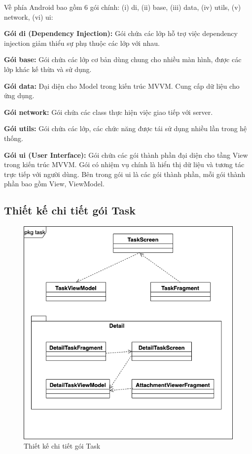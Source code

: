 \documentclass[../Main.tex]{subfiles}
\begin{document}
Về phía Android bao gồm 6 gói chính: (i) di, (ii) base, (iii) data, (iv) utils, (v) network, (vi) ui: 

\textbf{Gói di (Dependency Injection):} Gói chứa các lớp hỗ trợ việc dependency injection giảm thiểu sự phụ thuộc các lớp với nhau. 

\textbf{Gói base:} Gói chứa các lớp cơ bản dùng chung cho nhiều màn hình, được các lớp khác kế thừa và sử dụng.

\textbf{Gói data:} Đại diện cho Model trong kiến trúc MVVM. Cung cấp dữ liệu cho ứng dụng. 

\textbf{Gói network:} Gói chứa các class thực hiện việc giao tiếp với server.

\textbf{Gói utils:} Gói chứa các lớp, các chức năng được tái sử dụng nhiều lần trong hệ thống. 

\textbf{Gói ui (User Interface):} Gói chứa các gói thành phần đại diện cho tầng View trong kiến trúc MVVM. Gói có nhiệm vụ chính là hiển thị dữ liệu và tương tác trực tiếp với người dùng. Bên trong gói ui là các gói thành phần, mỗi gói thành phần bao gồm View, ViewModel. 
\newpage
\subsection{Thiết kế chi tiết gói Task} 
\begin{figure}[H]
    \centering
    \includegraphics[width=0.75\linewidth]{Figure/package_diagram_task.png}
    \caption{Thiết kế chi tiết gói Task}
    \label{fig:use_case_tổng_quan}
\end{figure}
\end{document}
